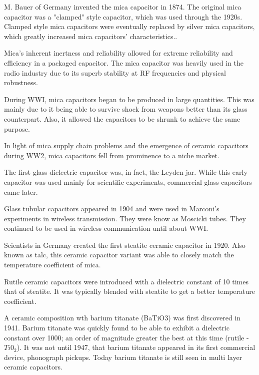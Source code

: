 \nocite{hh_cap_table}
\nocite{capGuide_mica}
\noindent M. Bauer of Germany invented the mica capacitor in 1874. The original mica capacitor was a "clamped" style capacitor, which was used through the 1920s.\cite{wiki_mica} Clamped style mica capacitors were eventually replaced by silver mica capacitors, which greatly increased mica capacitors' characteristics.\cite{learn_caps}.

\noindent Mica's inherent inertness and reliability allowed for extreme reliability and efficiency in a packaged capacitor.\cite{tedds_mica} The mica capacitor was heavily used in the radio industry due to its superb stability at RF frequencies and physical robustness.\cite{radio_mica}

\noindent During WWI, mica capacitors began to be produced in large quantities. This was mainly due to it being able to survive shock from weapons better than its glass counterpart. Also, it allowed the capacitors to be shrunk to achieve the same purpose. \cite[f.~37-41]{dumInv}

\noindent In light of mica supply chain problems and the emergence of ceramic capacitors during WW2, mica capacitors fell from prominence to a niche market.\cite[Ch 3, Sec II]{cerMaterials}

\noindent The first glass dielectric capacitor was, in fact, the Leyden jar. While this early capacitor was used mainly for scientific experiments, commercial glass capacitors came later. 

\noindent Glass tubular capacitors appeared in 1904 and were used in Marconi's experiments in wireless transmission. They were know as Moscicki tubes. They continued to be used in wireless communication until about WWI. \cite[p.~102]{dumInv}

\noindent Scientists in Germany created the first steatite ceramic capacitor in 1920. \cite[Ch 3 Sec II]{cerMaterials} \cite{cerDie} Also known as talc, this ceramic capacitor variant was able to closely match the temperature coefficient of mica.\cite{steatite_hf}     

\noindent Rutile ceramic capacitors were introduced with a dielectric constant of 10 times that of steatite. It was typically blended with steatite to get a better temperature coefficient. 

\noindent A ceramic composition wth barium titanate (BaTiO3) was first discovered in 1941. Barium titanate was quickly found to be able to exhibit a dielectric constant over 1000; an order of magnitude greater the best at this time (rutile - $Ti0_2$). It was not until 1947, that barium titanate appeared in its first commercial device, phonograph pickups.\cite{piezCer}\cite{hist_cerFilt}\cite[Ch 3 Sec III]{cerMaterials} Today barium titanate is still seen in multi layer ceramic capacitors.

